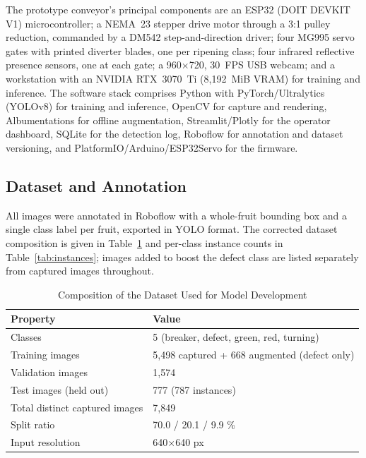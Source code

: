 \documentclass[journal]{IEEEtran}
\begin{document}
The prototype conveyor's principal components are an ESP32 (DOIT DEVKIT V1) microcontroller; a NEMA~23 stepper drive motor through a 3:1 pulley reduction, commanded by a DM542 step-and-direction driver; four MG995 servo gates with printed diverter blades, one per ripening class; four infrared reflective presence sensors, one at each gate; a 960$\times$720, 30~FPS USB webcam; and a workstation with an NVIDIA RTX~3070~Ti (8{,}192~MiB VRAM) for training and inference. The software stack comprises Python with PyTorch/Ultralytics (YOLOv8) for training and inference, OpenCV for capture and rendering, Albumentations for offline augmentation, Streamlit/Plotly for the operator dashboard, SQLite for the detection log, Roboflow for annotation and dataset versioning, and PlatformIO/Arduino/ESP32Servo for the firmware.

\subsection{Dataset and Annotation}
All images were annotated in Roboflow \cite{dwyer2024} with a whole-fruit bounding box and a single class label per fruit, exported in YOLO format. The corrected dataset composition is given in Table~\ref{tab:dataset} and per-class instance counts in Table~\ref{tab:instances}; images added to boost the defect class are listed separately from captured images throughout.

\begin{table}[!t]
\caption{Composition of the Dataset Used for Model Development}
\label{tab:dataset}
\centering
\begin{tabular}{p{4.6cm}p{2.8cm}}
\toprule
\textbf{Property} & \textbf{Value} \\
\midrule
Classes & 5 (breaker, defect, green, red, turning) \\
Training images & 5{,}498 captured + 668 augmented (defect only) \\
Validation images & 1{,}574 \\
Test images (held out) & 777 (787 instances) \\
Total distinct captured images & 7{,}849 \\
Split ratio & 70.0 / 20.1 / 9.9 \% \\
Input resolution & 640$\times$640 px \\
\bottomrule
\end{tabular}
\end{table}
\end{document}
